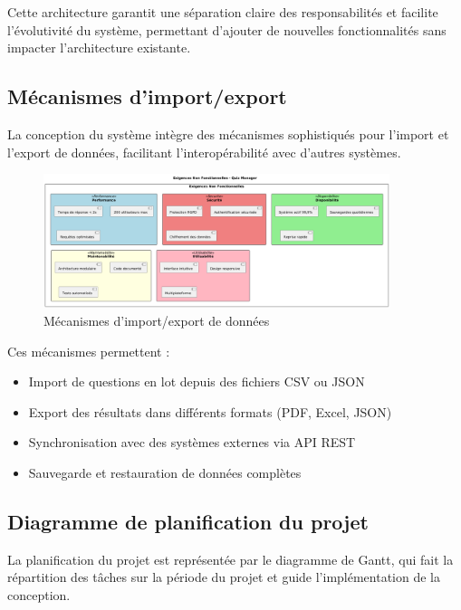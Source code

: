 \documentclass[12pt,a4paper]{report}
\begin{document}
Cette architecture garantit une séparation claire des responsabilités et facilite l'évolutivité du système, permettant d'ajouter de nouvelles fonctionnalités sans impacter l'architecture existante.

\subsection{Mécanismes d'import/export}

La conception du système intègre des mécanismes sophistiqués pour l'import et l'export de données, facilitant l'interopérabilité avec d'autres systèmes.

\begin{figure}[H]
\centering
\includegraphics[width=0.9\textwidth]{latex_media/media/image12.png}
\caption{Mécanismes d'import/export de données}
\label{fig:import-export-donnees}
\end{figure}

Ces mécanismes permettent :
\begin{itemize}
\item Import de questions en lot depuis des fichiers CSV ou JSON
\item Export des résultats dans différents formats (PDF, Excel, JSON)
\item Synchronisation avec des systèmes externes via API REST
\item Sauvegarde et restauration de données complètes
\end{itemize}

\subsection{Diagramme de planification du projet}

La planification du projet est représentée par le diagramme de Gantt, qui fait la répartition des tâches sur la période du projet et guide l'implémentation de la conception.
\end{document}
